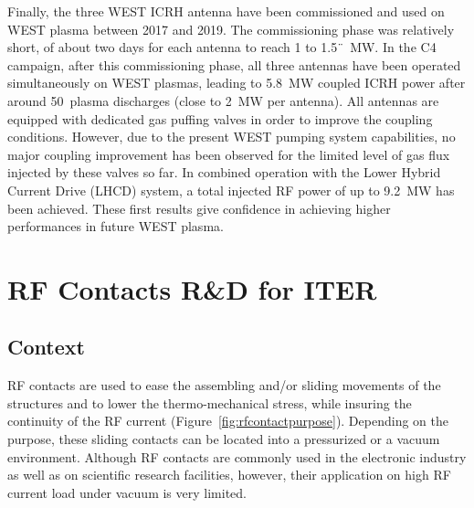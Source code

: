 {Finally, the three WEST ICRH antenna have been commissioned and used on WEST plasma between 2017 and 2019. The commissioning phase was relatively short, of about two days for each antenna to reach 1 to 1.5¨~MW. In the C4 campaign, after this commissioning phase, all three antennas have been operated simultaneously on WEST plasmas, leading to 5.8~MW coupled ICRH power after around 50~plasma discharges (close to 2~MW per antenna). All antennas are equipped with dedicated gas puffing valves in order to improve the coupling conditions. However, due to the present WEST pumping system capabilities, no major coupling improvement has been observed for the limited level of gas flux injected by these valves so far. In combined operation with the Lower Hybrid Current Drive (LHCD) system, a total injected RF power of up to 9.2~MW has been achieved. These first results give confidence in achieving higher performances in future WEST plasma.


\clearpage

\section{RF Contacts R\&D for ITER}\label{sec:RF_contacts}
\subsection{Context}
RF contacts are used to ease the assembling and/or sliding movements of the structures and to lower the thermo-mechanical stress, while insuring the continuity of the RF current (Figure~\ref{fig:rfcontactpurpose}). Depending on the purpose, these sliding contacts can be located into a pressurized or a vacuum environment. Although RF contacts are commonly used in the electronic industry as well as on scientific research facilities, however, their application on high RF current load under vacuum is very limited. 

}
